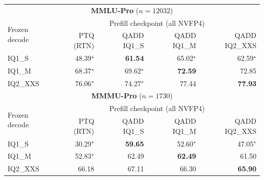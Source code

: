 \begin{tabular}{l|rrrr}
\toprule
\multicolumn{5}{c}{\textbf{MMLU-Pro} ($n=12032$)} \\
\multirow{2}{*}{Frozen decode} & \multicolumn{4}{c}{Prefill checkpoint (all NVFP4)} \\
 & PTQ (RTN) & QADD IQ1\_S & QADD IQ1\_M & QADD IQ2\_XXS \\
\midrule
IQ1\_S & 48.39$^{\star}$ & \textbf{61.54} & 65.02$^{\star}$ & 62.59$^{\star}$ \\
IQ1\_M & 68.37$^{\star}$ & 69.62$^{\star}$ & \textbf{72.59} & 72.85 \\
IQ2\_XXS & 76.06$^{\star}$ & 74.27$^{\star}$ & 77.44 & \textbf{77.93} \\
\midrule
\multicolumn{5}{c}{\textbf{MMMU-Pro} ($n=1730$)} \\
\multirow{2}{*}{Frozen decode} & \multicolumn{4}{c}{Prefill checkpoint (all NVFP4)} \\
 & PTQ (RTN) & QADD IQ1\_S & QADD IQ1\_M & QADD IQ2\_XXS \\
\midrule
IQ1\_S & 30.29$^{\star}$ & \textbf{59.65} & 52.60$^{\star}$ & 47.05$^{\star}$ \\
IQ1\_M & 52.83$^{\star}$ & 62.49 & \textbf{62.49} & 61.50 \\
IQ2\_XXS & 66.18 & 67.11 & 66.30 & \textbf{65.90} \\
\bottomrule
\end{tabular}
